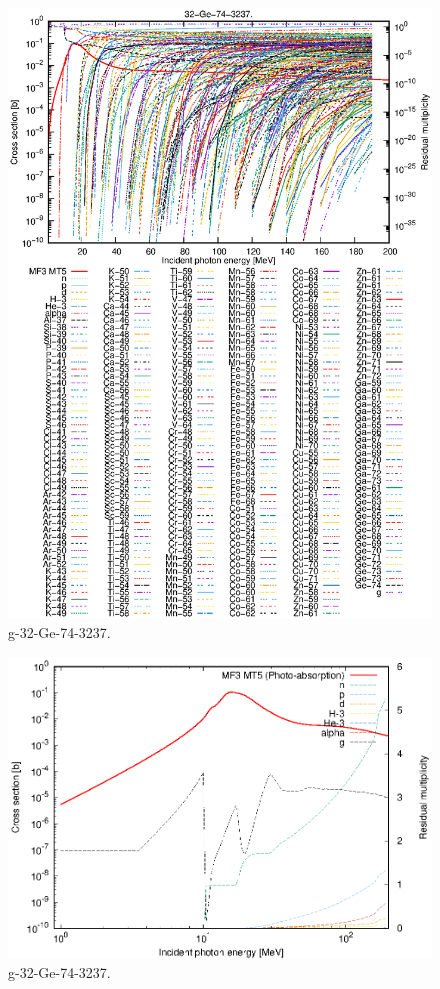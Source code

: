 \begin{figure}
 \includegraphics[width=\linewidth]{eps/g_32-Ge-74_3237.eps}
  \caption{g-32-Ge-74-3237.}
\end{figure}
\newpage \clearpage

\begin{figure}
 \includegraphics[width=\linewidth]{eps-log/g_32-Ge-74_3237.eps}
 \caption{g-32-Ge-74-3237.}
\end{figure}
\newpage \clearpage

